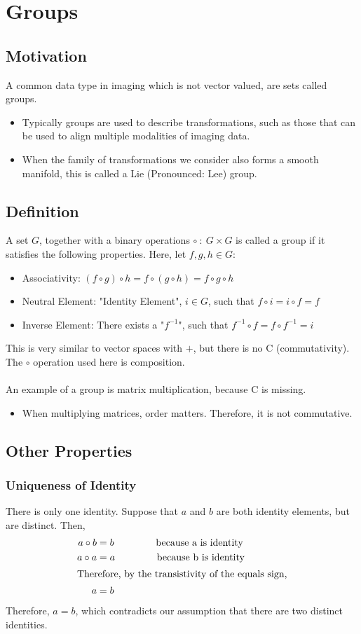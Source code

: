 \documentclass[10pt]{article}
\begin{document}
\section*{Groups}
\subsection*{Motivation}
A common data type in imaging which is not vector valued, are sets called groups.
\begin{itemize}
    \item Typically groups are used to describe transformations, such as those that can be used to align multiple modalities of imaging data.
    \item When the family of transformations we consider also forms a smooth manifold, this is called a Lie (Pronounced: Lee) group.
\end{itemize}
\subsection*{Definition}
A set $G$, together with a binary operations $\circ \::\: G \times G$ is called a group if it satisfies the following properties.  Here, let $f, g, h \in G$:
\begin{itemize}
    \item Associativity: $(f \circ g) \circ h = f \circ (g \circ h) = f \circ g \circ h$
    \item Neutral Element: "Identity Element", $i \in G$, such that $f \circ i = i \circ f = f$
    \item Inverse Element: There exists a "$f^{-1}$", such that $f^{-1} \circ f = f \circ f^{-1} = i$
\end{itemize}
This is very similar to vector spaces with $+$, but there is no C (commutativity).  The $\circ$ operation used here is composition.\\\\
An example of a group is matrix multiplication, because C is missing.
\begin{itemize}
    \item When multiplying matrices, order matters.  Therefore, it is not commutative.
\end{itemize}
\subsection*{Other Properties}
\subsubsection*{Uniqueness of Identity}
There is only one identity.  Suppose that $a$ and $b$ are both identity elements, but are distinct.  Then,
\begin{align*}
    a \circ b &= b \hspace{1.5cm} \text{because a is identity}\\
    a \circ a &= a \hspace{1.5cm} \text{because b is identity}\\
    \intertext{Therefore, by the transistivity of the equals sign,}
    a &= b
\end{align*}
Therefore, $a = b$, which contradicts our assumption that there are two distinct identities.
\end{document}
